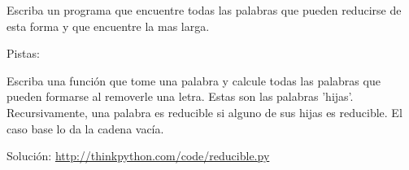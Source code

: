 \begin{enumerate}
Escriba un programa que encuentre todas las palabras que pueden reducirse
de esta forma y que encuentre la mas larga.

Pistas:

Escriba una función que tome una palabra y calcule todas las palabras
que pueden formarse al removerle una letra. Estas son las palabras
'hijas'. Recursivamente, una palabra es reducible si alguno de sus
hijas es reducible. El caso base lo da la cadena vacía.

Solución: \url{http://thinkpython.com/code/reducible.py} 
\end{enumerate}

